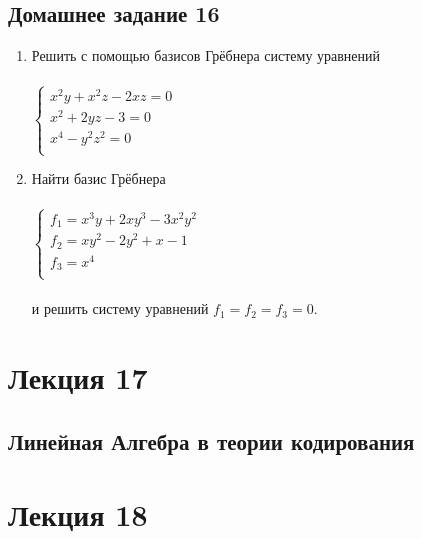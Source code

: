 \documentclass[12pt]{article}
\begin{document}
	\subsection{Домашнее задание 16}\begin{enumerate}
		\item Решить с помощью базисов Грёбнера систему уравнений\\ \\
		$
		\left\{
		\begin{array}{lcl}
		x^2y+x^2z-2xz=0\\
		x^2+2yz-3=0\\
		x^4-y^2z^2=0\\
		\end{array}
		\right.
		$
		\item Найти базис Грёбнера\\ \\
		$
		\left\{
		\begin{array}{lcl}
		f_1=x^3y+2xy^3-3x^2y^2\\
		f_2=xy^2-2y^2+x-1\\
		f_3=x^4\\
		\end{array}
		\right.
		$
		\\ \\и решить систему уравнений $f_1=f_2=f_3=0$.
	\end{enumerate}
	
	
	\newpage
	\section{Лекция 17}
	\subsection{Линейная Алгебра в теории кодирования}
	
	\newpage
	\section{Лекция 18}
\end{document}
